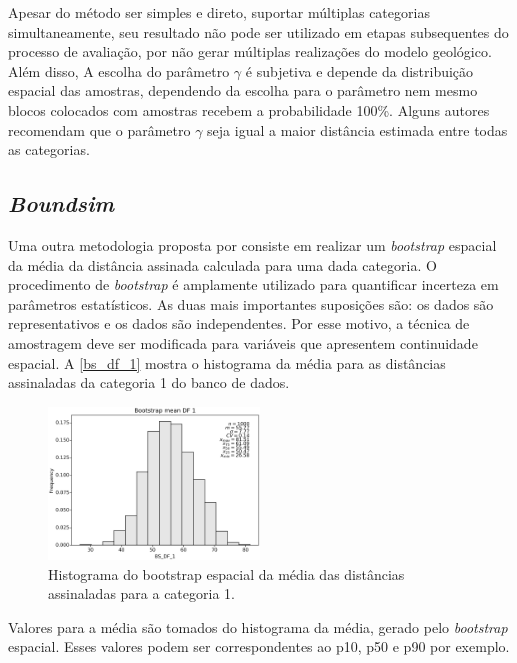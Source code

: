 Apesar do método ser simples e direto, suportar múltiplas categorias simultaneamente, seu resultado não pode ser utilizado em etapas subsequentes do processo de  avaliação, por não gerar múltiplas realizações do modelo geológico. Além disso, A escolha do parâmetro $\gamma$ é subjetiva e depende da distribuição espacial das amostras, dependendo da escolha para o parâmetro nem mesmo blocos colocados com amostras recebem a probabilidade 100\%. Alguns autores recomendam que o parâmetro $\gamma$ seja igual a maior distância estimada entre todas as categorias.

\subsection{\textit{Boundsim}}

Uma outra metodologia proposta por  consiste em realizar um \textit{bootstrap} espacial \cite{deutsh_spatial_bootstrap} da média da distância assinada calculada para uma dada categoria. O procedimento de \textit{bootstrap} é amplamente utilizado para quantificar incerteza em parâmetros estatísticos. As duas mais importantes suposições são: os dados são representativos e os dados são independentes. Por esse motivo, a técnica de amostragem deve ser modificada para variáveis que apresentem continuidade espacial. A \autoref{bs_df_1} mostra o histograma da média para as distâncias assinaladas da categoria 1 do banco de dados. 

\begin{figure}[H]
	\caption{\label{bs_df_1}Histograma do bootstrap espacial da média das distâncias assinaladas para a categoria 1.}
	\begin{center}
		\includegraphics[width=0.5\textwidth]{capitulo_2/BS_DF_1.png}
	\end{center}
\end{figure}

Valores para a média são tomados do histograma da média, gerado pelo \textit{bootstrap} espacial. Esses valores podem ser correspondentes ao p10, p50 e p90 por exemplo.

